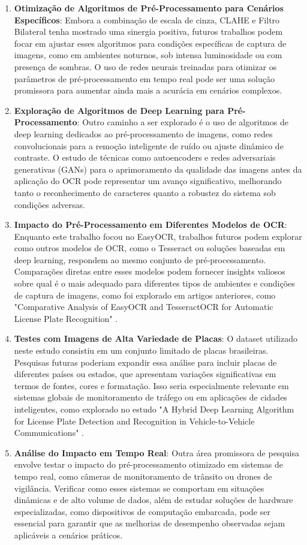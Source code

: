 \documentclass[conference]{IEEEtran}
\begin{document}
\begin{enumerate}
	\item \textbf{Otimização de Algoritmos de Pré-Processamento para Cenários Específicos}: Embora a combinação de escala de cinza, CLAHE e Filtro Bilateral tenha mostrado uma sinergia positiva, futuros trabalhos podem focar em ajustar esses algoritmos para condições específicas de captura de imagens, como em ambientes noturnos, sob intensa luminosidade ou com presença de sombras. O uso de redes neurais treinadas para otimizar os parâmetros de pré-processamento em tempo real pode ser uma solução promissora para aumentar ainda mais a acurácia em cenários complexos.
	\item \textbf{Exploração de Algoritmos de Deep Learning para Pré-Processamento}: Outro caminho a ser explorado é o uso de algoritmos de deep learning dedicados ao pré-processamento de imagens, como redes convolucionais para a remoção inteligente de ruído ou ajuste dinâmico de contraste. O estudo de técnicas como autoencoders e redes adversariais generativas (GANs) para o aprimoramento da qualidade das imagens antes da aplicação do OCR pode representar um avanço significativo, melhorando tanto o reconhecimento de caracteres quanto a robustez do sistema sob condições adversas.
	\item \textbf{Impacto do Pré-Processamento em Diferentes Modelos de OCR}: Enquanto este trabalho focou no EasyOCR, trabalhos futuros podem explorar como outros modelos de OCR, como o Tesseract ou soluções baseadas em deep learning, respondem ao mesmo conjunto de pré-processamento. Comparações diretas entre esses modelos podem fornecer insights valiosos sobre qual é o mais adequado para diferentes tipos de ambientes e condições de captura de imagens, como foi explorado em artigos anteriores, como "Comparative Analysis of EasyOCR and TesseractOCR for Automatic License Plate Recognition" \cite{b1}.
	\item \textbf{Testes com Imagens de Alta Variedade de Placas}: O dataset utilizado neste estudo consistiu em um conjunto limitado de placas brasileiras. Pesquisas futuras poderiam expandir essa análise para incluir placas de diferentes países ou estados, que apresentam variações significativas em termos de fontes, cores e formatação. Isso seria especialmente relevante em sistemas globais de monitoramento de tráfego ou em aplicações de cidades inteligentes, como explorado no estudo "A Hybrid Deep Learning Algorithm for License Plate Detection and Recognition in Vehicle-to-Vehicle Communications" \cite{b7}.
	\item \textbf{Análise do Impacto em Tempo Real}: Outra área promissora de pesquisa envolve testar o impacto do pré-processamento otimizado em sistemas de tempo real, como câmeras de monitoramento de trânsito ou drones de vigilância. Verificar como esses sistemas se comportam em situações dinâmicas e de alto volume de dados, além de estudar soluções de hardware especializadas, como dispositivos de computação embarcada, pode ser essencial para garantir que as melhorias de desempenho observadas sejam aplicáveis a cenários práticos.

\end{enumerate}
\end{document}
